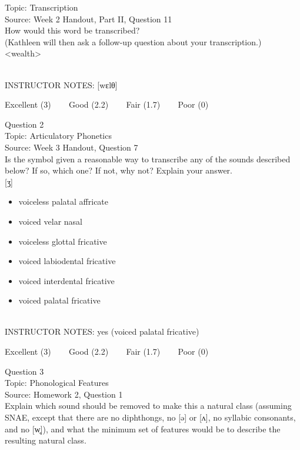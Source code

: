 \documentclass[12pt]{article}
\begin{document}
Topic: Transcription\\
Source: Week 2 Handout, Part II, Question 11\\

How would this word be transcribed?\\ (Kathleen will then ask a follow-up question about your transcription.)\\

<wealth>


~\\
INSTRUCTOR NOTES: [wɛlθ]


\vfill
Excellent (3) ~~~ Good (2.2) ~~~ Fair (1.7) ~~~ Poor (0)
\newpage

{\large Question 2}\\

Topic: Articulatory Phonetics\\
Source: Week 3 Handout, Question 7\\

Is the symbol given a reasonable way to transcribe any of the sounds described below? If so, which one? If not, why not? Explain your answer.\\

{[ʒ]}

\begin{itemize} \item voiceless palatal affricate \item voiced velar nasal \item voiceless glottal fricative \item voiced labiodental fricative \item voiced interdental fricative \item voiced palatal fricative \end{itemize}


~\\
INSTRUCTOR NOTES: yes (voiced palatal fricative)


\vfill
Excellent (3) ~~~ Good (2.2) ~~~ Fair (1.7) ~~~ Poor (0)
\newpage

{\large Question 3}\\

Topic: Phonological Features\\
Source: Homework 2, Question 1\\

Explain which sound should be removed to make this a natural class (assuming SNAE, except that there are no diphthongs, no [ə] or [ʌ], no syllabic consonants, and no [w̥]), and what the minimum set of features would be to describe the resulting natural class.\\
\end{document}
